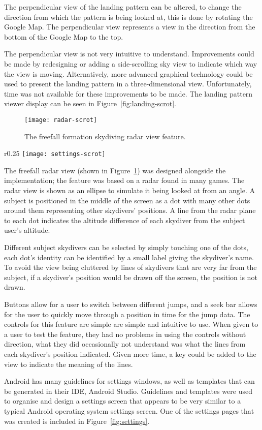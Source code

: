 The perpendicular view of the landing pattern can be altered, to change the direction from which the pattern is being looked at, this is done by rotating the Google Map. The perpendicular view represents a view in the direction from the bottom of the Google Map to the top.

The perpendicular view is not very intuitive to understand. Improvements could be made by redesigning or adding a side-scrolling sky view to indicate which way the view is moving. Alternatively, more advanced graphical technology could be used to present the landing pattern in a three-dimensional view. Unfortunately, time was not available for these improvements to be made.
The landing pattern viewer display can be seen in Figure~\ref{fig:landing-scrot}.

\begin{figure}[!t]
  \centering
  \texttt{[image: radar-scrot]}
  \caption{The freefall formation skydiving radar view feature.}\label{fig:radar}
\end{figure}

\begin{wrapfigure}[19]{r}{0.25\textwidth}
  \centering
  \texttt{[image: settings-scrot]}
  \caption{The settings screen for the app.}\label{fig:settings}
\end{wrapfigure}

The freefall radar view (shown in Figure~\ref{fig:radar}) was designed alongside the implementation; the feature was based on a radar found in many games. The radar view is shown as an ellipse to simulate it being looked at from an angle. A subject is positioned in the middle of the screen as a dot with many other dots around them representing other skydivers' positions. A line from the radar plane to each dot indicates the altitude difference of each skydiver from the subject user's altitude.


Different subject skydivers can be selected by simply touching one of the dots, each dot's identity can be identified by a small label giving the skydiver's name. To avoid the view being cluttered by lines of skydivers that are very far from the subject, if a skydiver's position would be drawn off the screen, the position is not drawn.

Buttons allow for a user to switch between different jumps, and a seek bar allows for the user to quickly move through a position in time for the jump data. The controls for this feature are simple are simple and intuitive to use. When given to a user to test the feature, they had no problems in using the controls without direction, what they did occasionally not understand was what the lines from each skydiver's position indicated. Given more time, a key could be added to the view to indicate the meaning of the lines.

Android has many guidelines for settings windows, as well as templates that can be generated in their IDE, Android Studio. Guidelines and templates were used to organise and design a settings screen that appears to be very similar to a typical Android operating system settings screen.
One of the settings pages that was created is included in Figure~\ref{fig:settings}.
